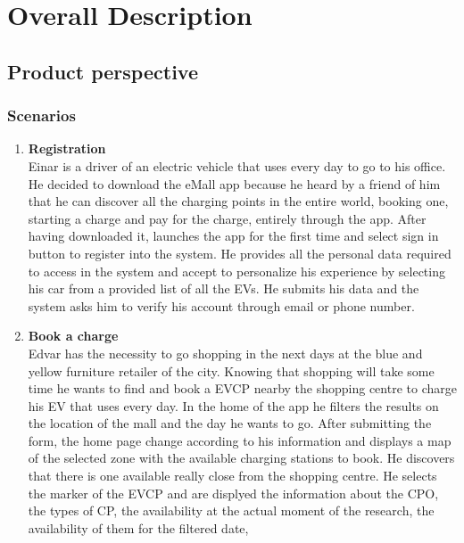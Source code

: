 \section{Overall Description}

\subsection{Product perspective}

\subsubsection{Scenarios}
\begin{enumerate}[label=\textbf{\Alph*}.]
      \item \textbf{Registration} \\
            Einar is a driver of an electric vehicle that uses every day to go to his
            office. He decided to download the eMall app because he heard by a friend
            of him that he can discover all the charging points in the entire world,
            booking one, starting a charge and pay for the charge, entirely through
            the app. After having downloaded it, launches the app for the first time
            and select sign in button to register into the system. He provides all
            the personal data required to access in the system and accept to personalize
            his experience by selecting his car from a provided list of all the EVs.
            He submits his data and the system asks him to verify his account through email or phone number.
      \item \textbf{Book a charge} \\
            Edvar has the necessity to go shopping in the next days at the blue and yellow furniture retailer of the city. Knowing
            that shopping will take some time he wants to find and book a EVCP nearby the shopping centre to charge his EV that uses every day.
            In the home of the app he filters the results on the location of the mall and the day he wants to go.
            After submitting the form, the home page change according to his information and displays
            a map of the selected zone with the available charging stations to book. He discovers that there is one available
            really close from the shopping centre. He selects the marker of the EVCP and are displyed the information about the CPO,
            the types of CP, the availability at the actual moment of the research, the availability of them for the filtered date,

\end{enumerate}
